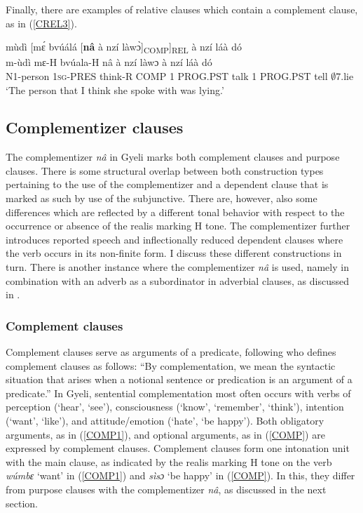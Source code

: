 Finally, there are examples of relative clauses which contain a complement clause, as in (\ref{CREL3}).

\begin{exe} 
\ex\label{CREL3} 
  \glll mùdì [mɛ́ bvúálá [{\bfseries nâ} à nzí làwɔ̀]\textsubscript{COMP}]\textsubscript{REL} à nzí láà dó \\
        m-ùdì mɛ-H bvúala-H nâ à nzí làwɔ à nzí láà dó \\
       N1-person 1\textsc{sg}-PRES think-R COMP 1 PROG.PST talk 1 PROG.PST tell $\emptyset$7.lie  \\
    \trans `The person that I think she spoke with was lying.'
\end{exe}













\subsection{Complementizer clauses}
\label{sec:Compna}

The complementizer {\itshape nâ} in Gyeli marks both complement clauses and purpose clauses. There is some structural overlap between both construction types pertaining to the use of the complementizer and a dependent clause that is marked as such by use of the subjunctive. There are, however, also some differences which are reflected by a different tonal behavior with respect to the occurrence or absence of the realis marking H tone. The complementizer further introduces reported speech and inflectionally reduced dependent clauses where the verb occurs in its non-finite form. I discuss these different constructions in turn. There is another instance where the complementizer {\itshape nâ} is used, namely in combination with an adverb as a subordinator in adverbial clauses, as discussed in .  

\subsubsection{Complement clauses}
\label{sec:CompC}

Complement clauses serve as arguments of a predicate, following \citet[52]{noonan2007} who defines complement clauses as follows:
``By complementation, we mean the syntactic situation that arises when a notional sentence or predication is an argument of a predicate.''
In Gyeli, sentential complementation most often occurs with verbs of perception (`hear', `see'), consciousness (`know', `remember', `think'), intention (`want', `like'), and attitude/emotion (`hate', `be happy'). 
Both obligatory arguments, as in (\ref{COMP1}), and optional arguments, as in (\ref{COMP}) are expressed by complement clauses. Complement clauses form one intonation unit with the main clause, as indicated by the realis marking H tone on the verb {\itshape wúmbɛ} `want' in (\ref{COMP1}) and {\itshape sìsɔ} `be happy' in (\ref{COMP}). In this, they differ from purpose clauses with the complementizer {\itshape nâ}, as discussed in the next section.

